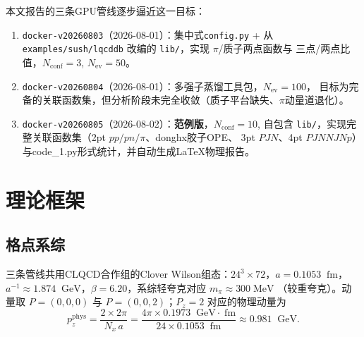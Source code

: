 \documentclass[11pt,a4paper]{article}
\newcommand{\gev}{\;\mathrm{GeV}}
\newcommand{\fm}{\;\mathrm{fm}}
\newcommand{\Nconf}{N_{\mathrm{conf}}}
\newcommand{\Nev}{N_{\mathrm{ev}}}
\newcommand{\apm}{a^{-1}}
\begin{document}
本文报告的三条GPU管线逐步逼近这一目标：
\begin{enumerate}[leftmargin=*]
\item \texttt{docker-v20260803}（2026-08-01）：集中式\texttt{config.py} + 从
      \texttt{examples/sush/lqcddb} 改编的 \texttt{lib/}，实现 $\pi$/质子两点函数与
      三点/两点比值，$\Nconf=3$, $\Nev=50$。
\item \texttt{docker-v20260804}（2026-08-01）：多强子蒸馏工具包，$\Nev=100$，
      目标为完备的关联函数集，但分析阶段未完全收敛（质子平台缺失、$\pi$动量道退化）。
\item \texttt{docker-v20260805}（2026-08-02）：\textbf{范例版}，$\Nconf=10$,
      自包含 \texttt{lib/}，实现完整关联函数集（2pt $pp/pn/\pi$、donghx胶子OPE、
      3pt $PJN$、4pt $PJNNJNp$）与code\_1.py形式统计，并自动生成LaTeX物理报告。
\end{enumerate}

\section{理论框架}

\subsection{格点系综}
三条管线共用CLQCD合作组的Clover Wilson组态：$24^3\times72$，$a=0.1053\;\fm$，
$\apm\approx1.874\;\gev$，$\beta=6.20$，系综轻夸克对应 $m_\pi\approx300\;\mathrm{MeV}$
（较重夸克）。动量取 $P=(0,0,0)$ 与 $P=(0,0,2)$；$P_z=2$ 对应的物理动量为
\begin{equation}
p_z^{\mathrm{phys}}=\frac{2\times2\pi}{N_x\,a}
=\frac{4\pi\times0.1973\;\gev\!\cdot\!\fm}{24\times0.1053\;\fm}\approx0.981\;\gev .
\label{eq:pz}
\end{equation}
\end{document}
